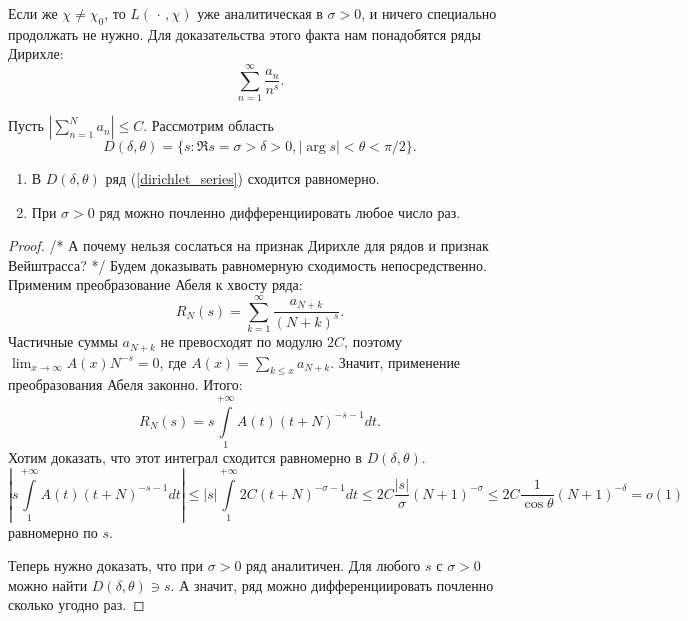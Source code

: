 Если же $\chi \ne \chi_0$, то $L(\,\cdot\,, \chi)$ уже аналитическая в $\sigma > 0$, и ничего специально продолжать не нужно. Для доказательства этого факта нам понадобятся ряды Дирихле:
\begin{equation}
\label{dirichlet_series}
  \sum_{n=1}^{\infty} \frac{a_n}{n^s}.
\end{equation}

\begin{lemma}
  Пусть $\left| \sum_{n=1}^N a_n\right| \leqslant C$. Рассмотрим область
  $$
    D(\delta, \theta) = \{s : \Re s = \sigma > \delta > 0, |\arg s| < \theta < \pi / 2 \}.
  $$
  \begin{enumerate}
    \item В $D(\delta, \theta)$ ряд (\ref{dirichlet_series}) сходится равномерно.
    \item При $\sigma > 0$ ряд можно почленно дифференциировать любое число раз.
  \end{enumerate}
\end{lemma}
\begin{proof}
  /* А почему нельзя сослаться на признак Дирихле для рядов и признак Вейштрасса? */
  Будем доказывать равномерную сходимость непосредственно. Применим преобразование Абеля к хвосту ряда:
  $$
    R_{N}(s) = \sum_{k = 1}^{\infty} \frac{a_{N + k}}{(N + k)^s}.
  $$
  Частичные суммы $a_{N + k}$ не превосходят по модулю $2C$, поэтому $\lim_{x \to \infty} A(x) N^{-s} = 0$, где $A(x) = \sum_{k \leqslant x} a_{N + k}$. Значит, применение преобразования Абеля законно.
  Итого:
  $$
    R_N(s) = s \int \limits_1^{+\infty} A(t) (t + N)^{-s-1} dt.
  $$
  Хотим доказать, что этот интеграл сходится равномерно в $D(\delta, \theta)$.
  $$
    \left|s \int \limits_1^{+\infty} A(t) (t + N)^{-s-1} dt \right| \leq
    |s| \int \limits_1^{+\infty} 2C (t + N)^{-\sigma-1} dt \leq
    2C \frac{|s|}{\sigma}(N + 1)^{-\sigma} \leqslant 2C \frac{1}{\cos \theta} (N + 1)^{-\delta} = o(1)  
  $$
  равномерно по $s$.
  
  Теперь нужно доказать, что при $\sigma > 0$ ряд аналитичен. Для любого $s$ с $\sigma > 0$ можно найти $D(\delta, \theta) \ni s$. А значит, ряд можно дифференциировать почленно сколько угодно раз.
\end{proof}

